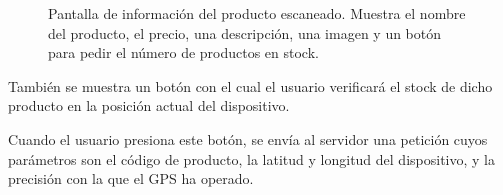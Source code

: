 \begin{figure}[H]
	\centering
	\caption{Pantalla de información del producto escaneado. Muestra el nombre del producto, el precio, una descripción, una imagen y un botón para pedir el número de productos en stock.}
	\label{fig:infoProducto}
\end{figure}

También se muestra un botón con el cual el usuario verificará el stock de dicho producto en la posición actual del dispositivo.

Cuando el usuario presiona este botón, se envía al servidor una petición cuyos parámetros son el código de producto, la latitud y longitud del dispositivo, y la precisión con la que el GPS ha operado.

